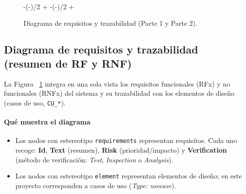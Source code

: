 \begin{landscape}
\begin{figure}[p]
  \centering
  \newlength{\sideair}\setlength{\sideair}{-2.4cm}

  \begin{adjustwidth*}
    {-\dimexpr(\paperwidth-\textwidth)/2 + \sideair\relax}
    {-\dimexpr(\paperwidth-\textwidth)/2 + \sideair\relax}
    \centering
  \end{adjustwidth*}

  \caption{Diagrama de requisitos y trazabilidad (Parte 1 y Parte 2).}
  \label{fig:diagRequisitosSplit}
\end{figure}
\end{landscape}

\subsection*{Diagrama de requisitos y trazabilidad (resumen de RF y RNF)}
La Figura ~\ref{fig:diagRequisitosSplit} integra en una sola vista los requisitos funcionales (RFx) y no funcionales (RNFx) del sistema y su trazabilidad con los elementos de diseño (casos de uso, \texttt{CU\_*}). 

\paragraph{Qué muestra el diagrama}
\begin{itemize}
  \item Los nodos con estereotipo \texttt{\guillemotleft requirements\guillemotright} representan requisitos. Cada uno recoge: \textbf{Id}, \textbf{Text} (resumen), \textbf{Risk} (prioridad/impacto) y \textbf{Verification} (método de verificación: \emph{Test}, \emph{Inspection} o \emph{Analysis}).
  \item Los nodos con estereotipo \texttt{\guillemotleft element\guillemotright} representan elementos de diseño; en este proyecto corresponden a casos de uso (\emph{Type: usecase}).
\end{itemize}

